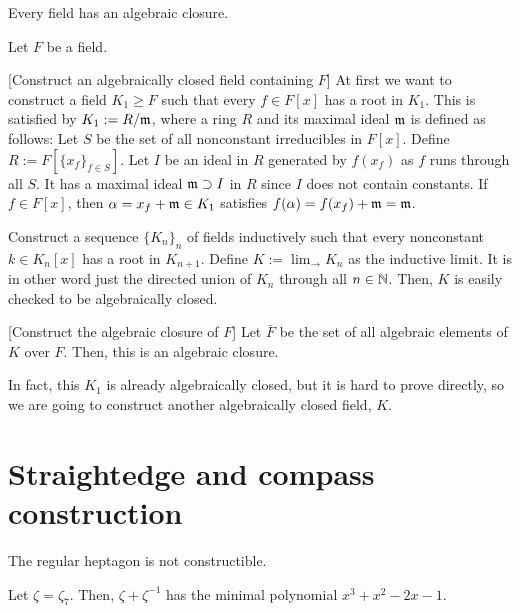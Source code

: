 \documentclass{../note}
\begin{document}
\begin{prb}
Every field has an algebraic closure.
\end{prb}
\begin{pf}
Let $F$ be a field.

[Construct an algebraically closed field containing $F$]
At first we want to construct a field $K_1\ge F$ such that every $f\in F[x]$ has a root in $K_1$.
This is satisfied by $K_1:=R/\mathfrak{m}$, where a ring $R$ and its maximal ideal $\mathfrak{m}$ is defined as follows:
Let $S$ be the set of all nonconstant irreducibles in $F[x]$.
Define $R:=F[\{x_f\}_{f\in S}]$.
Let $I$ be an ideal in $R$ generated by $f(x_f)$ as $f$ runs through all $S$.
It has a maximal ideal $\mathfrak{m}\supset I$ in $R$ since $I$ does not contain constants.
If $f\in F[x]$, then $\alpha=x_f+\mathfrak{m}\in K_1$ satisfies $f(\alpha)=f(x_f)+\mathfrak{m}=\mathfrak{m}$.

Construct a sequence $\{K_n\}_n$ of fields inductively such that every nonconstant $k\in K_n[x]$ has a root in $K_{n+1}$.
Define $K:=\lim_{\to}K_n$ as the inductive limit.
It is in other word just the directed union of $K_n$ through all $n\in\mathbb{N}$.
Then, $K$ is easily checked to be algebraically closed.

[Construct the algebraic closure of $F$]
Let $\bar F$ be the set of all algebraic elements of $K$ over $F$.
Then, this is an algebraic closure.
\end{pf}
\begin{rmk}
In fact, this $K_1$ is already algebraically closed, but it is hard to prove directly, so we are going to construct another algebraically closed field, $K$.
\end{rmk}


\section{Straightedge and compass construction}
\begin{prb}
\begin{parts}
\item The regular heptagon is not constructible.
\end{parts}
\end{prb}
\begin{pf}
Let $\zeta=\zeta_7$.
Then, $\zeta+\zeta^{-1}$ has the minimal polynomial $x^3+x^2-2x-1$.
\end{pf}

\begin{prb}

\end{prb}
\end{document}
